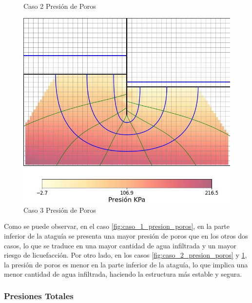 \begin{figure}[H]
\begin{minipage}{0.32\textwidth}
        \caption{Caso 2 Presión de Poros}
        \label{fig:caso_2_presion_poros}
    \end{minipage}
    \begin{minipage}{0.32\textwidth}
        \centering
        \includegraphics[width=\textwidth]{GRAFICOS/caso_3_presion_poros.jpg}
        \caption{Caso 3 Presión de Poros}
        \label{fig:caso_3_presion_poros}
    \end{minipage}
\end{figure}

Como se puede observar, en el caso \ref{fig:caso_1_presion_poros}, en la parte inferior de la ataguía se presenta una mayor presión de poros que en los otros dos casos, lo que se traduce en una mayor cantidad de agua infiltrada y un mayor riesgo de licuefacción. Por otro lado, en los casos \ref{fig:caso_2_presion_poros} y \ref{fig:caso_3_presion_poros}, la presión de poros es menor en la parte inferior de la ataguía, lo que implica una menor cantidad de agua infiltrada, haciendo la estructura más estable y segura.

\subsubsection{Presiones Totales}


